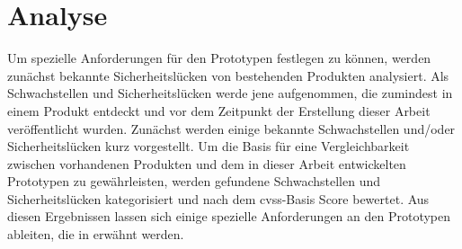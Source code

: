 \section{Analyse}
\label{sec:analysis}
	Um spezielle Anforderungen für den Prototypen festlegen zu können, werden zunächst bekannte Sicherheitslücken von bestehenden Produkten analysiert. 
	Als Schwachstellen und Sicherheitslücken werde jene aufgenommen, die zumindest in einem Produkt entdeckt und vor dem Zeitpunkt der Erstellung dieser Arbeit veröffentlicht wurden.
	Zunächst werden einige bekannte Schwachstellen und/oder Sicherheitslücken kurz vorgestellt.
	Um die Basis für eine Vergleichbarkeit zwischen vorhandenen Produkten und dem in dieser Arbeit entwickelten Prototypen zu gewährleisten, werden gefundene Schwachstellen und Sicherheitslücken kategorisiert und nach dem \gls{cvss}-Basis Score bewertet.
	Aus diesen Ergebnissen lassen sich einige spezielle Anforderungen an den Prototypen ableiten, die in  erwähnt werden.
